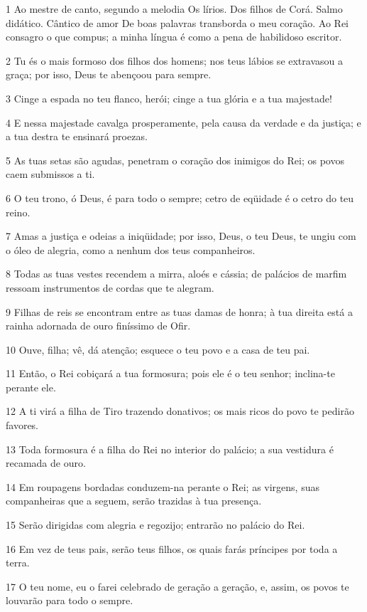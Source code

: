 \par 1 Ao mestre de canto, segundo a melodia Os lírios. Dos filhos de Corá. Salmo didático. Cântico de amor De boas palavras transborda o meu coração. Ao Rei consagro o que compus; a minha língua é como a pena de habilidoso escritor.
\par 2 Tu és o mais formoso dos filhos dos homens; nos teus lábios se extravasou a graça; por isso, Deus te abençoou para sempre.
\par 3 Cinge a espada no teu flanco, herói; cinge a tua glória e a tua majestade!
\par 4 E nessa majestade cavalga prosperamente, pela causa da verdade e da justiça; e a tua destra te ensinará proezas.
\par 5 As tuas setas são agudas, penetram o coração dos inimigos do Rei; os povos caem submissos a ti.
\par 6 O teu trono, ó Deus, é para todo o sempre; cetro de eqüidade é o cetro do teu reino.
\par 7 Amas a justiça e odeias a iniqüidade; por isso, Deus, o teu Deus, te ungiu com o óleo de alegria, como a nenhum dos teus companheiros.
\par 8 Todas as tuas vestes recendem a mirra, aloés e cássia; de palácios de marfim ressoam instrumentos de cordas que te alegram.
\par 9 Filhas de reis se encontram entre as tuas damas de honra; à tua direita está a rainha adornada de ouro finíssimo de Ofir.
\par 10 Ouve, filha; vê, dá atenção; esquece o teu povo e a casa de teu pai.
\par 11 Então, o Rei cobiçará a tua formosura; pois ele é o teu senhor; inclina-te perante ele.
\par 12 A ti virá a filha de Tiro trazendo donativos; os mais ricos do povo te pedirão favores.
\par 13 Toda formosura é a filha do Rei no interior do palácio; a sua vestidura é recamada de ouro.
\par 14 Em roupagens bordadas conduzem-na perante o Rei; as virgens, suas companheiras que a seguem, serão trazidas à tua presença.
\par 15 Serão dirigidas com alegria e regozijo; entrarão no palácio do Rei.
\par 16 Em vez de teus pais, serão teus filhos, os quais farás príncipes por toda a terra.
\par 17 O teu nome, eu o farei celebrado de geração a geração, e, assim, os povos te louvarão para todo o sempre.

